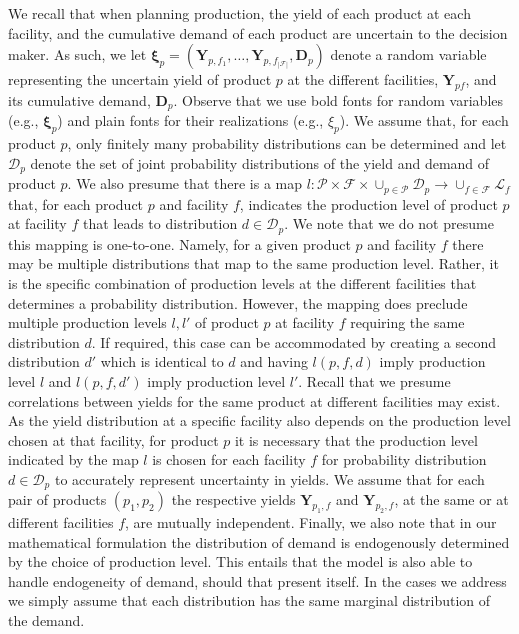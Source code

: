 \documentclass[12pt]{article}
\theoremstyle{thmstylethree}%
\begin{document}
We recall that when planning production, the yield of each product at each facility, and the cumulative demand of each product are uncertain to the decision maker. 
As such, we let $\bm{\xi}_p=(\mathbf{Y}_{p,f_1},\ldots,\mathbf{Y}_{p,f_{|\mathcal{F}|}},\mathbf{D}_p)$ denote a random variable representing the uncertain yield of product $p$ at the different facilities, $\mathbf{Y}_{pf}$, and its cumulative demand, $\mathbf{D}_p$. Observe that we use bold fonts for random variables (e.g., $\bm{\xi}_p$) and plain fonts for their realizations (e.g., $\xi_p$). We assume that, for each product $p$, only finitely many probability distributions can be determined and let $\mathcal{D}_p$ denote the set of  joint probability distributions of the yield and demand of product $p$. 
We also presume that there is a map $l:\mathcal{P}\times\mathcal{F}\times \cup_{p\in\mathcal{P}}\mathcal{D}_p\to \cup_{f\in\mathcal{F}}\mathcal{L}_f$ that, for each product $p$ and facility $f$, indicates the production level of product $p$ at facility $f$ that leads to distribution $d \in \mathcal{D}_p$. 
We note that we do not presume this mapping is one-to-one. Namely, for a given product $p$ and facility $f$ there may be multiple distributions that map to the same production level. Rather, it is the specific combination of production levels at the different facilities that determines a probability distribution.  However, the mapping does preclude  multiple production levels $l,l'$ of product $p$ at facility $f$ requiring the same distribution $d.$ If required, this case can be accommodated by creating a second distribution $d'$ which is identical to $d$ and having $l(p,f,d)$ imply production level $l$ and $l(p,f,d')$ imply production level $l'.$
Recall that we presume correlations between yields for the same product at different facilities may exist.
As the yield distribution at a specific facility also depends on the production level chosen at that facility,
for product $p$ it is necessary that the production level indicated by the map $l$ is chosen for each facility $f$ for probability distribution $d\in\mathcal{D}_p$ to accurately represent uncertainty in yields.
We assume that for each pair of products $(p_1,p_2)$ the respective yields $\mathbf{Y}_{p_1,f}$ and $\mathbf{Y}_{p_2,f}$, at the same or at different facilities $f$, are mutually independent.
Finally, we also note that in our mathematical formulation the distribution of demand is endogenously determined by the choice of production level. This entails that the model is also able to handle endogeneity of demand, should that present itself. In the cases we address we simply assume that each distribution has the same marginal distribution of the demand.
\end{document}
